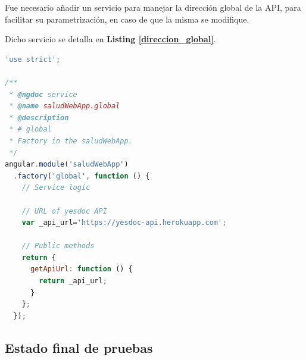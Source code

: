 Fue necesario añadir un servicio para manejar la dirección global de la API, para facilitar su parametrización, en caso de que la misma se modifique.

Dicho servicio se detalla en \textbf{Listing \ref{direccion_global}}.

\begin{lstlisting}[language=JavaScript, caption=Servicio de la dirección global de la API, label=direccion_global]
'use strict';                                                                   
                                                                                
/**                                                                             
 * @ngdoc service                                                               
 * @name saludWebApp.global                                                     
 * @description                                                                 
 * # global                                                                     
 * Factory in the saludWebApp.                                                  
 */                                                                             
angular.module('saludWebApp')                                                   
  .factory('global', function () {                                              
    // Service logic                                                               
                                                                                
    // URL of yesdoc API                                                           
    var _api_url='https://yesdoc-api.herokuapp.com';                               
                                                                                   
    // Public methods                                                              
    return {                                                                       
      getApiUrl: function () {                                                     
        return _api_url;                                                           
      }                                                                            
    };                                                                             
  });                                                       
\end{lstlisting}


\subsection{Estado final de pruebas}

